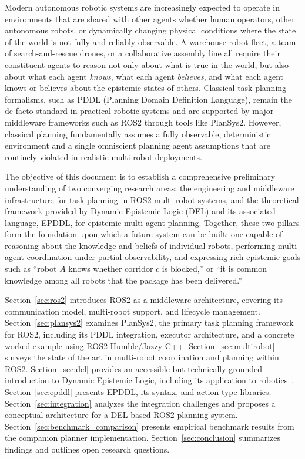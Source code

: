 \documentclass[12pt,a4paper]{article}
\theoremstyle{definition}
\theoremstyle{plain}
\begin{document}
Modern autonomous robotic systems are increasingly expected to operate in environments that are
shared with other agents whether human operators, other autonomous robots, or dynamically
changing physical conditions where the state of the world is not fully and reliably observable.
A warehouse robot fleet, a team of search-and-rescue drones, or a collaborative assembly line all
require their constituent agents to reason not only about what is true in the world, but also about
what each agent \textit{knows}, what each agent \textit{believes}, and what each agent knows or
believes about the epistemic states of others. Classical task planning formalisms, such as PDDL
(Planning Domain Definition Language), remain the de facto standard in practical robotic systems
and are supported by major middleware frameworks such as ROS2 through tools like PlanSys2.
However, classical planning fundamentally assumes a fully observable, deterministic environment
and a single omniscient planning agent assumptions that are routinely violated in realistic
multi-robot deployments.

The objective of this document is to establish a comprehensive preliminary understanding of two
converging research areas: the engineering and middleware infrastructure for task planning in ROS2
multi-robot systems, and the theoretical framework provided by Dynamic Epistemic Logic (DEL) and
its associated language, EPDDL, for epistemic multi-agent planning. Together, these two pillars
form the foundation upon which a future system can be built: one capable of reasoning about the
knowledge and beliefs of individual robots, performing multi-agent coordination under partial
observability, and expressing rich epistemic goals such as ``robot $A$ knows whether corridor $c$
is blocked,'' or ``it is common knowledge among all robots that the package has been delivered.''

Section~\ref{sec:ros2} introduces ROS2 as a middleware architecture, covering its communication
model, multi-robot support, and lifecycle management. Section~\ref{sec:plansys2} examines PlanSys2,
the primary task planning framework for ROS2, including its PDDL integration, executor architecture,
and a concrete worked example using ROS2 Humble/Jazzy C++. Section~\ref{sec:multirobot} surveys
the state of the art in multi-robot coordination and planning within ROS2. Section~\ref{sec:del}
provides an accessible but technically grounded introduction to Dynamic Epistemic Logic, including
its application to robotics~\cite{bramblett2023icra,bramblett2023frontiers,bramblett2025active,lowe2010planning}.
Section~\ref{sec:epddl} presents EPDDL, its syntax, and action type libraries.
Section~\ref{sec:integration} analyzes the integration challenges and proposes a conceptual
architecture for a DEL-based ROS2 planning system. Section~\ref{sec:benchmark_comparison}
presents empirical benchmark results from the companion planner implementation.
Section~\ref{sec:conclusion} summarizes findings and outlines open research questions.
\end{document}
